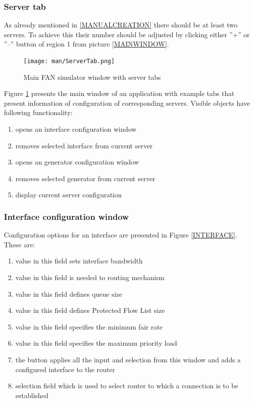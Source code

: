\documentclass[a4paper,12pt]{article}
\begin{document}
    \subsubsection{Server tab}
	    
	    As already mentioned in \ref{MANUALCREATION} there should be at least two
	    servers. To achieve this their number should be adjusted by clicking either
	    ''+'' or ''--'' button of region 1 from picture \ref{MAINWINDOW}.
	 	\begin{figure}[cht]
		\texttt{[image: man/ServerTab.png]}
		\caption{Main FAN simulator window with server tabs}
		\label{SERVERTAB}
		\end{figure}
	
		Figure \ref{SERVERTAB} presents the main window of an application with example
		tabs that present information of configuration of corresponding servers.
		Visible objects have following functionality:	
		  
		\begin{enumerate}
		\item {opens an interface configuration window}
		\item {removes selected interface from current server}
		\item {opens an generator configuration window}
		\item {removes selected generator from current server}
		\item {display current server configuration}
		\end{enumerate} 

	\subsubsection{Interface configuration window}
	
	Configuration options for an interface are presented in Figure \ref{INTERFACE}.
	These are:
		
		\begin{enumerate}
		\item {value in this field sets interface bandwidth}
		\item {value in this field is needed to routing mechanism }
		\item {value in this field defines queue size}
		\item {value in this field defines Protected Flow List size }
		\item {value in this field specifies the minimum fair rate }
		\item {value in this field specifies the maximum priority load }
		\item {the button applies all the input and selection from this window and
		adds a configured interface to the router}
		\item {selection field which is used to select router to which a connection
		is to be established}
        \end{enumerate} 
        
\end{document}
